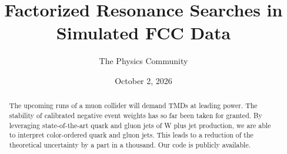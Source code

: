 \documentclass[11pt]{article}
\title{Factorized Resonance Searches in Simulated FCC Data}
\author{The Physics Community}
\date{October 2, 2026}
\begin{document}
\maketitle
\begin{abstract}
The upcoming runs of a muon collider will demand TMDs at leading power.
The stability of calibrated negative event weights has so far been taken
for granted. By leveraging state-of-the-art quark and gluon jets of W
plus jet production, we are able to interpret color-ordered quark and
gluon jets. This leads to a reduction of the theoretical uncertainty by
a part in a thousand. Our code is publicly available.
\end{abstract}
\tableofcontents




\nocite{*}


\end{document}
